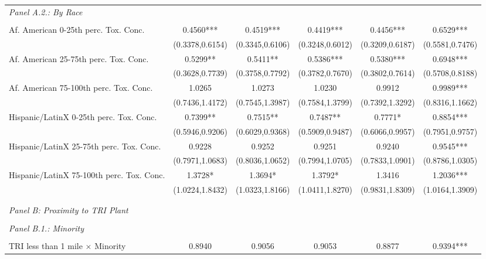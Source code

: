 \begin{table}[H]
\begin{threeparttable}
\begin{tabular}{@{\extracolsep{5pt}}lccccc}
{\it Panel A.2.: By Race }\\                 &  &  &    \\
Af. American 0-25th perc. Tox. Conc.&      0.4560***&      0.4519***&      0.4419***&      0.4456***&      0.6529***\\
                    &(0.3378,0.6154)   &(0.3345,0.6106)   &(0.3248,0.6012)   &(0.3209,0.6187)   &(0.5581,0.7476)   \\
Af. American 25-75th perc. Tox. Conc.&      0.5299** &      0.5411** &      0.5386***&      0.5380***&      0.6948***\\
                    &(0.3628,0.7739)   &(0.3758,0.7792)   &(0.3782,0.7670)   &(0.3802,0.7614)   &(0.5708,0.8188)   \\
Af. American 75-100th perc. Tox. Conc.&      1.0265   &      1.0273   &      1.0230   &      0.9912   &      0.9989***\\
                    &(0.7436,1.4172)   &(0.7545,1.3987)   &(0.7584,1.3799)   &(0.7392,1.3292)   &(0.8316,1.1662)   \\
Hispanic/LatinX 0-25th perc. Tox. Conc.&      0.7399** &      0.7515** &      0.7487** &      0.7771*  &      0.8854***\\
                    &(0.5946,0.9206)   &(0.6029,0.9368)   &(0.5909,0.9487)   &(0.6066,0.9957)   &(0.7951,0.9757)   \\
Hispanic/LatinX 25-75th perc. Tox. Conc.&      0.9228   &      0.9252   &      0.9251   &      0.9240   &      0.9545***\\
                    &(0.7971,1.0683)   &(0.8036,1.0652)   &(0.7994,1.0705)   &(0.7833,1.0901)   &(0.8786,1.0305)   \\
Hispanic/LatinX 75-100th perc. Tox. Conc.&      1.3728*  &      1.3694*  &      1.3792*  &      1.3416   &      1.2036***\\
                    &(1.0224,1.8432)   &(1.0323,1.8166)   &(1.0411,1.8270)   &(0.9831,1.8309)   &(1.0164,1.3909)   \\
             \\[-1.8ex]\hline        \hline \\[-1.8ex] 
  {\it Panel B: Proximity to TRI Plant}\\                                  \hline \\[-1.8ex]        
{\it Panel B.1.: Minority} \\                                  &  &  &    \\
TRI less than 1 mile $\times$ Minority&      0.8940   &      0.9056   &      0.9053   &      0.8877   &      0.9394***\\

\end{tabular}
\end{threeparttable}
\end{table}
